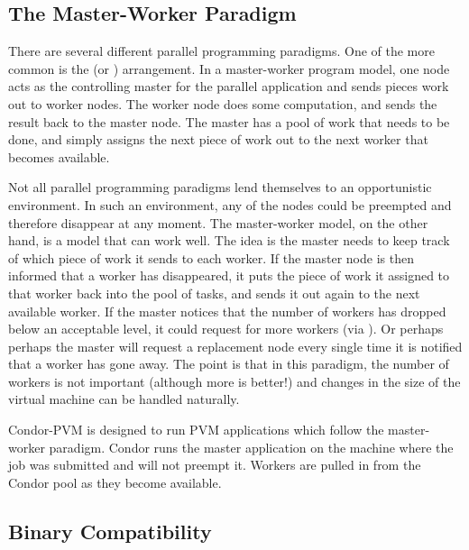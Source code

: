 \subsection{The Master-Worker Paradigm}

There are several different parallel programming paradigms.  One of the
more common is the  (or )
arrangement.  In a master-worker program model, one node acts as the
controlling master for the parallel application and sends pieces work out to worker nodes.  The
worker node does some computation, and sends the result back to the
master node.  The master has a pool of work that needs to be
done, and simply assigns the next piece of work out to the next worker
that becomes available.  

Not all parallel programming paradigms lend themselves to an
opportunistic environment. In such an environment, any of the nodes
could be preempted and therefore disappear at any moment. The
master-worker model, on the other hand, is a model that can work well.
The idea is the master needs to keep track of which piece of work it
sends to each worker. If the master node is then informed that a worker
has disappeared, it puts the piece of work it assigned to that worker
back into the pool of tasks, and sends it out again to the next
available worker. If the master notices that the number of workers has
dropped below an acceptable level, it could request for more workers
(via ). Or perhaps perhaps the master will request
a replacement node every single time it is notified that a worker has
gone away. The point is that in this paradigm, the number of workers is
not important (although more is better!) and changes in the size of
the virtual machine can be handled naturally.

Condor-PVM is designed to run PVM applications which follow the
master-worker paradigm.  Condor runs the master application on the
machine where the job was submitted and will not preempt it.  Workers
are pulled in from the Condor pool as they become available.

\subsection{Binary Compatibility}

